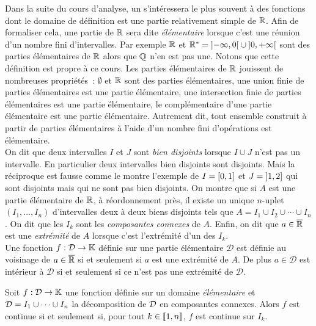 \documentclass{magnolia}
\begin{document}
Dans la suite du cours d'analyse, un s'intéressera le plus souvent à des fonctions dont
le domaine de définition est une partie relativement simple de $\mathbb{R}$. Afin de formaliser cela,
une partie de $\mathbb{R}$ sera dite \emph{élémentaire} lorsque c'est une réunion d'un nombre fini
d'intervalles. Par exemple $\mathbb{R}$ et ${\mathbb{R}^*}=\left]-\infty,0\right[\cup\left]0,+\infty\right[$ sont des parties élémentaires
de $\mathbb{R}$ alors que $\mathbb{Q}$ n'en est pas une. Notons que cette définition est propre à ce cours.
Les parties élémentaires de $\mathbb{R}$ jouissent de nombreuses propriétés~:
$\emptyset$ et $\mathbb{R}$ sont des parties élémentaires,
une union finie de parties élémentaires est une partie élémentaire,
une intersection finie de parties élémentaires est une partie élémentaire,
le complémentaire d'une partie élémentaire est une partie élémentaire.
Autrement dit, tout ensemble construit à partir de parties élémentaires à l'aide d'un nombre
fini d'opérations est élémentaire.\\

On dit que deux intervalles $I$ et $J$ sont \emph{bien disjoints} lorsque $I\cup J$ n'est
pas un intervalle. En particulier deux intervalles bien disjoints sont disjoints. Mais
la réciproque est fausse comme le montre l'exemple de $I=\left[0,1\right]$ et
$J=\left]1,2\right]$ qui sont disjoints mais qui ne sont pas bien disjoints.
On montre
que si $A$ est une partie élémentaire de $\mathbb{R}$, à réordonnement près, il existe un unique
$n$-uplet $(I_1,\ldots,I_n)$ d'intervalles deux à deux biens disjoints tels que
$A=I_1\cup I_2\cup\cdots\cup I_n$. On dit que les $I_k$ sont les
\emph{composantes connexes} de $A$. Enfin, on dit que $a\in\overline{\mathbb{R}}$ est
une \emph{extrémité} de $A$ lorsque c'est l'extrémité d'un des $I_k$.\\

Une fonction $f:\mathcal{D}\to\mathbb{K}$ définie sur une partie élémentaire $\mathcal{D}$
  est définie au voisinage de $a\in\overline{\mathbb{R}}$ si et seulement si $a$ est une extrémité de $A$.
  De plus $a\in\mathcal{D}$ est intérieur à $\mathcal{D}$ si et seulement si ce n'est pas
  une extrémité de $\mathcal{D}$.\\
  



\begin{proposition}
Soit $f:\mathcal{D}\to\mathbb{K}$ une fonction définie sur un domaine \emph{élémentaire} et
$\mathcal{D}=I_1\cup\cdots\cup I_n$ la décomposition de $\mathcal{D}$ en composantes connexes. Alors $f$
est continue si et seulement si, pour tout $k\in\left\llbracket 1,n\right\rrbracket$, $f$ est continue
sur $I_k$.
\end{proposition}
\end{document}
